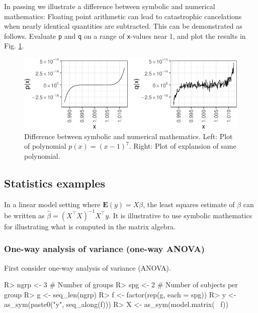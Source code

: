 In passing we illustrate a difference between symbolic and numerical
mathematics: Floating point arithmetic can lead to catastrophic
cancelations when nearly identical quantities are subtracted. This can
be demonstrated as follows. Evaluate \texttt{p} and \texttt{q} on a
range of \texttt{x}-values near 1, and plot the results in Fig.
\ref{fig:pols-pq}.

\begin{Schunk}
\begin{figure}
\includegraphics{pols-pq-1} \caption[Difference between symbolic and numerical mathematics]{Difference between symbolic and numerical mathematics. Left: Plot of polynomial $p(x) = (x-1)^7$. Right: Plot of explansion of same polynomial.}\label{fig:pols-pq}
\end{figure}
\end{Schunk}

\hypertarget{statistics-examples}{%
\subsection{Statistics examples}\label{statistics-examples}}

In a linear model setting where \(\mathbf{E}(y)=X\beta\), the least
squares estimate of \(\beta\) can be written as
\(\hat\beta = (X^\top X)^{-1} X^\top y\). It is illustrative to use
symbolic mathematics for illustrating what is computed in the matrix
algebra.

\hypertarget{one-way-analysis-of-variance-one-way-anova}{%
\subsubsection{One-way analysis of variance (one-way
ANOVA)}\label{one-way-analysis-of-variance-one-way-anova}}

First consider one-way analysis of variance (ANOVA).

\begin{Schunk}
\begin{Sinput}
R> ngrp <- 3 # Number of groups
R> spg  <- 2 # Number of subjects per group
R> g <- seq_len(ngrp)
R> f <- factor(rep(g, each = spg))
R> y <- as_sym(paste0("y", seq_along(f)))
R> X <- as_sym(model.matrix(~ f))
\end{Sinput}
\end{Schunk}

